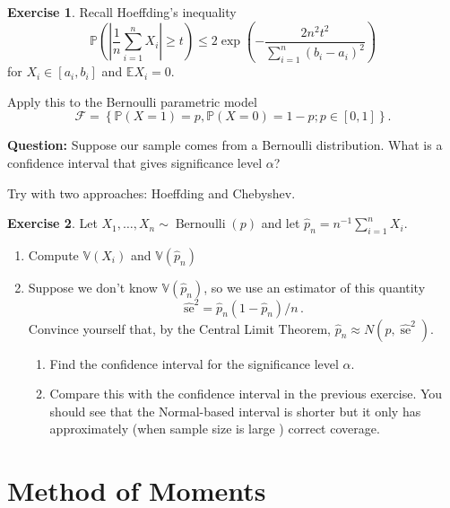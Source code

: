 \documentclass[
  openany]{book}
\theoremstyle{definition}
\theoremstyle{definition}
\theoremstyle{definition}
\newtheorem{exercise}{Exercise}[chapter]
\theoremstyle{definition}
\theoremstyle{remark}
\begin{document}
\begin{exercise}
Recall Hoeffding's inequality
\[ \mathbb{P}\left( \left| \frac{1}{n}\sum_{i=1}^n X_i \right| \geq t \right) 
\leq 2  \exp\left( - \frac{2 n^2 t^2}{\sum_{i=1}^n (b_i - a_i)^2}   \right) \]
for \(X_i \in [a_i, b_i]\) and \(\mathbb{E}X_i = 0\).

Apply this to the Bernoulli parametric model
\[\mathcal{F} = \left\{ \mathbb{P}(X= 1) = p, \mathbb{P}(X = 0) = 1-p; p \in [0,1]   \right\}.\]

\textbf{Question:} Suppose our sample comes from a Bernoulli distribution.
What is a confidence interval that gives significance level \(\alpha\)?

Try with two approaches: Hoeffding and Chebyshev.
\end{exercise}

\begin{exercise}

Let \(X_1, \ldots, X_n \sim \operatorname{Bernoulli}(p)\) and let \(\widehat{p}_n=n^{-1} \sum_{i=1}^n X_i\).

\begin{enumerate}
\def\labelenumi{\arabic{enumi}.}
\item
  Compute \(\mathbb{V}( X_i)\) and \(\mathbb{V}(\hat p_n)\)
\item
  Suppose we don't know \(\mathbb{V}(\hat p_n)\), so we use an estimator of this quantity
  \[\widehat{\mathrm{se}}^2 = {\widehat{p}_n\left(1-\widehat{p}_n\right) / n} \,.\]
  Convince yourself that, by the Central Limit Theorem, \(\widehat{p}_n \approx N\left(p, \widehat{\operatorname{se}}^2\right)\).

  \begin{enumerate}
  \def\labelenumii{\arabic{enumii}.}
  \item
    Find the confidence interval for the significance level \(\alpha\).
  \item
    Compare this with the confidence interval in the previous exercise.
    You should see that the Normal-based interval is shorter but it only has approximately (when sample size is large ) correct coverage.
  \end{enumerate}
\end{enumerate}

\end{exercise}

\section{Method of Moments}\label{method-of-moments}
\end{document}
